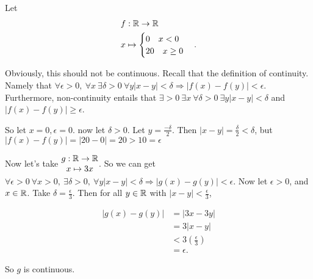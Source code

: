 \documentclass[12pt, twosided]{article}
\begin{document}
\begin{exa}
  Let
  \begin{align*}
    &f: \mathbb{R} \to \mathbb{R} \\
    &x \mapsto
    \begin{cases}
      0 \quad x < 0 \\
      20 \quad x \geq 0
    \end{cases}.
  \end{align*}

  Obviously, this should not be continuous. Recall that the definition of continuity. Namely that \(\forall \epsilon > 0,\ \forall x\ \exists \delta > 0\ \forall y | x - y | < \delta \Rightarrow |f(x) - f(y)| < \epsilon\). Furthermore, non-continuity entails that \(\exists > 0\ \exists x\ \forall \delta > 0\ \exists y |x - y| < \delta\) and \(|f(x) - f(y)| \geq \epsilon\).

  So let \(x = 0, \epsilon = 0.\) now let \(\delta > 0\). Let \(y = \frac{-\delta}{2}\). Then \(|x - y| = \frac{\delta}{2} < \delta\), but \(|f(x) - f(y)| = |20 -0| = 20 > 10 = \epsilon\)
\end{exa}

Now let's take \(\begin{matrix} g: \mathbb{R} \to \mathbb{R} \\  x \mapsto 3x\end{matrix}
\). So we can get \(\forall \epsilon > 0\ \forall x > 0,\ \exists \delta > 0,\ \forall y |x - y| < \delta \Rightarrow |g(x) - g(y)| < \epsilon\).
Now let \(\epsilon > 0\), and \(x \in \mathbb{R}\). Take \(\delta = \frac{\epsilon}{3}\). Then for all \(y \in \mathbb{R}\) with \(|x -y| < \frac{\epsilon}{3}\),

\begin{align*}
  |g(x) - g(y)| &= |3x - 3y| \\
                &= 3|x - y| \\
                &< 3\left(\frac{\epsilon}{3}\right) \\
                &= \epsilon.
\end{align*}

So \(g\) is continuous.
\end{document}
